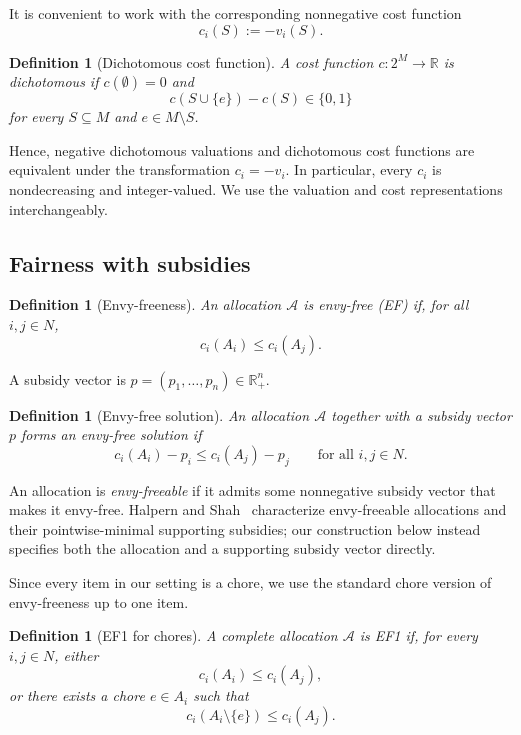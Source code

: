 \documentclass[sigconf,anonymous]{aamas}
\newcommand{\agents}{N}
\newcommand{\items}{M}
\newcommand{\alloc}{\mathcal{A}}
\newcommand{\bundle}[1]{A_{#1}}
\newcommand{\subsidy}{p}
\newcommand{\cost}{c}
\newcommand{\R}{\mathbb{R}}
\theoremstyle{acmplain}
\theoremstyle{acmdefinition}
\newtheorem{definition}[theorem]{Definition}
\theoremstyle{acmplain}
\begin{document}
It is convenient to work with the corresponding nonnegative cost
function
\[
\cost_i(S):=-v_i(S).
\]

\begin{definition}[Dichotomous cost function]
\label{def:dichcost}
A cost function $\cost:2^{\items}\to\R$ is \emph{dichotomous} if
$\cost(\emptyset)=0$ and
\[
\cost(S\cup\{e\})-\cost(S)\in\{0,1\}
\]
for every $S\subseteq\items$ and $e\in\items\setminus S$.
\end{definition}

Hence, negative dichotomous valuations and dichotomous cost
functions are equivalent under the transformation
$\cost_i=-v_i$. In particular, every $\cost_i$ is nondecreasing and
integer-valued. We use the valuation and cost representations
interchangeably.

\subsection{Fairness with subsidies}

\begin{definition}[Envy-freeness]
\label{def:ef}
An allocation $\alloc$ is \emph{envy-free} (EF) if, for all
$i,j\in\agents$,
\[
\cost_i(\bundle{i})\le \cost_i(\bundle{j}).
\]
\end{definition}

A subsidy vector is $\subsidy=(\subsidy_1,\ldots,\subsidy_n)\in
\R_+^n$.

\begin{definition}[Envy-free solution]
\label{def:efsolution}
An allocation $\alloc$ together with a subsidy vector $\subsidy$
forms an \emph{envy-free solution} if
\[
\cost_i(\bundle{i})-\subsidy_i
\le
\cost_i(\bundle{j})-\subsidy_j
\qquad\text{for all }i,j\in\agents.
\]
\end{definition}

An allocation is \emph{envy-freeable} if it admits some
nonnegative subsidy vector that makes it envy-free. Halpern and
Shah~\cite{HS19} characterize envy-freeable allocations and their
pointwise-minimal supporting subsidies; our construction below
instead specifies both the allocation and a supporting subsidy
vector directly.

Since every item in our setting is a chore, we use the standard
chore version of envy-freeness up to one item.

\begin{definition}[EF1 for chores]
\label{def:ef1}
\label{def:ef1chores}
A complete allocation $\alloc$ is \emph{EF1} if, for every
$i,j\in\agents$, either
\[
\cost_i(\bundle{i})\le \cost_i(\bundle{j}),
\]
or there exists a chore $e\in\bundle{i}$ such that
\[
\cost_i(\bundle{i}\setminus\{e\})
\le
\cost_i(\bundle{j}).
\]
\end{definition}
\end{document}

